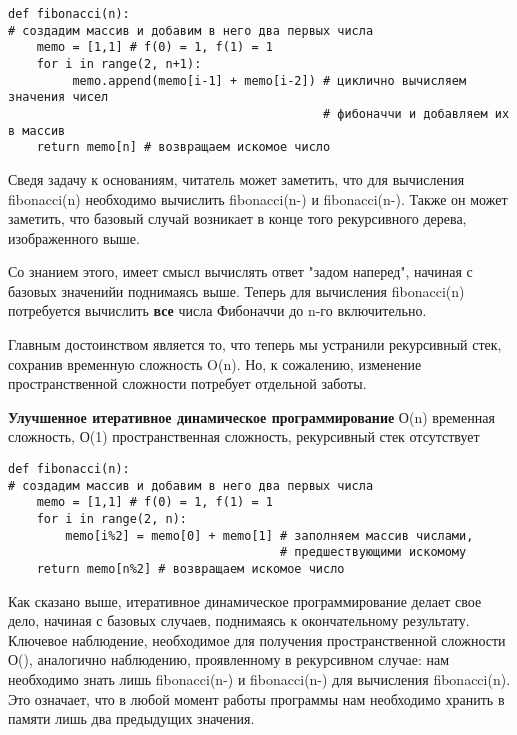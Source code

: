 \vspace{\baselineskip}
\begin{tcolorbox}
\begin{verbatim}
def fibonacci(n):
# создадим массив и добавим в него два первых числа
	memo = [1,1] # f(0) = 1, f(1) = 1
	for i in range(2, n+1):
		 memo.append(memo[i-1] + memo[i-2]) # циклично вычисляем значения чисел 
											# фибоначчи и добавляем их в массив
	return memo[n] # возвращаем искомое число
\end{verbatim}
\end{tcolorbox}

\vspace{\baselineskip}
Сведя задачу к основаниям, читатель может заметить, что для вычисления fibonacci(n) необходимо вычислить fibonacci(n-) и fibonacci(n-). Также он может заметить, что базовый случай возникает в конце того рекурсивного дерева, изображенного выше. 

\vspace{\baselineskip}
Со знанием этого, имеет смысл вычислять ответ "задом наперед", начиная с базовых значенийи поднимаясь выше. Теперь для вычисления fibonacci(n) потребуется вычислить \textbf{все} числа Фибоначчи до n-го включительно.

\vspace{\baselineskip}
Главным достоинством является то, что теперь мы устранили рекурсивный стек, сохранив временную сложность O(n). Но, к сожалению, изменение пространственной сложности потребует отдельной заботы.

\vspace{\baselineskip}
\textbf{Улучшенное итеративное динамическое программирование} О(n) временная сложность, О(1) пространственная сложность, рекурсивный стек отсутствует

\vspace{\baselineskip}
\begin{tcolorbox}
\begin{verbatim}
def fibonacci(n):
# создадим массив и добавим в него два первых числа
	memo = [1,1] # f(0) = 1, f(1) = 1
	for i in range(2, n):
		memo[i%2] = memo[0] + memo[1] # заполняем массив числами, 
									  # предшествующими искомому
	return memo[n%2] # возвращаем искомое число
\end{verbatim}
\end{tcolorbox}

\vspace{\baselineskip}
Как сказано выше, итеративное динамическое программирование делает свое дело, начиная с базовых случаев, поднимаясь к окончательному результату. Ключевое наблюдение, необходимое для получения пространственной сложности О(), аналогично наблюдению, проявленному в рекурсивном случае: нам необходимо знать лишь fibonacci(n-) и fibonacci(n-) для вычисления fibonacci(n). Это означает, что в любой момент работы программы нам необходимо хранить в памяти лишь два предыдущих значения.


